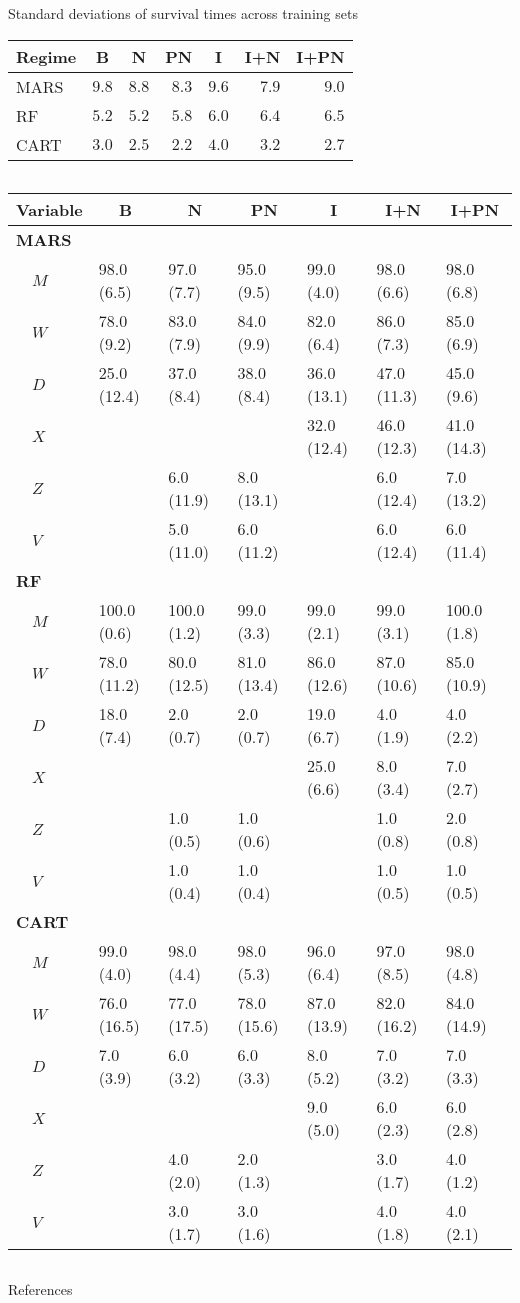 \documentclass{beamer}
\begin{document}
\begin{frame}{Standard deviations of survival times across training sets}
  \begin{table}[!htbp]
  \centering
  \begin{tabular}{lrrrrrr}
  \toprule \multicolumn{1}{c}{Regime}&\multicolumn{1}{c}{B}&\multicolumn{1}{c}{N}&\multicolumn{1}{c}{PN}&\multicolumn{1}{c}{I}&\multicolumn{1}{c}{I+N}&\multicolumn{1}{c}{I+PN}\tabularnewline
  \midrule
  MARS&$9.8$&$8.8$&$8.3$&$9.6$&$7.9$&$9.0$\tabularnewline
  RF&$5.2$&$5.2$&$5.8$&$6.0$&$6.4$&$6.5$\tabularnewline
  CART&$3.0$&$2.5$&$2.2$&$4.0$&$3.2$&$2.7$\tabularnewline
  \bottomrule
  \end{tabular}
  \end{table}
\end{frame}

\begin{frame}[c]{}
  \begin{columns}
    \column{\dimexpr\paperwidth}
\begin{table}
\scriptsize
\centering
\begin{tabular}{lllllll}
\toprule
\multicolumn{1}{l}{Variable}&\multicolumn{1}{c}{B}&\multicolumn{1}{c}{N}&\multicolumn{1}{c}{PN}&\multicolumn{1}{c}{I}&\multicolumn{1}{c}{I+N}&\multicolumn{1}{c}{I+PN}\tabularnewline
\midrule
{\bfseries MARS}&&&&&&\tabularnewline
~~$M$&98.0 (6.5)&97.0 (7.7)&95.0 (9.5)&99.0 (4.0)&98.0 (6.6)&98.0 (6.8)\tabularnewline
~~$W$&78.0 (9.2)&83.0 (7.9)&84.0 (9.9)&82.0 (6.4)&86.0 (7.3)&85.0 (6.9)\tabularnewline
~~$D$&25.0 (12.4)&37.0 (8.4)&38.0 (8.4)&36.0 (13.1)&47.0 (11.3)&45.0 (9.6)\tabularnewline
~~$X$&&&&32.0 (12.4)&46.0 (12.3)&41.0 (14.3)\tabularnewline
~~$Z$&&6.0 (11.9)&8.0 (13.1)&&6.0 (12.4)&7.0 (13.2)\tabularnewline
~~$V$&&5.0 (11.0)&6.0 (11.2)&&6.0 (12.4)&6.0 (11.4)\tabularnewline
\midrule
{\bfseries RF}&&&&&&\tabularnewline
~~$M$&100.0 (0.6)&100.0 (1.2)&99.0 (3.3)&99.0 (2.1)&99.0 (3.1)&100.0 (1.8)\tabularnewline
~~$W$&78.0 (11.2)&80.0 (12.5)&81.0 (13.4)&86.0 (12.6)&87.0 (10.6)&85.0 (10.9)\tabularnewline
~~$D$&18.0 (7.4)&2.0 (0.7)&2.0 (0.7)&19.0 (6.7)&4.0 (1.9)&4.0 (2.2)\tabularnewline
~~$X$&&&&25.0 (6.6)&8.0 (3.4)&7.0 (2.7)\tabularnewline
~~$Z$&&1.0 (0.5)&1.0 (0.6)&&1.0 (0.8)&2.0 (0.8)\tabularnewline
~~$V$&&1.0 (0.4)&1.0 (0.4)&&1.0 (0.5)&1.0 (0.5)\tabularnewline
\midrule
{\bfseries CART}&&&&&&\tabularnewline
~~$M$&99.0 (4.0)&98.0 (4.4)&98.0 (5.3)&96.0 (6.4)&97.0 (8.5)&98.0 (4.8)\tabularnewline
~~$W$&76.0 (16.5)&77.0 (17.5)&78.0 (15.6)&87.0 (13.9)&82.0 (16.2)&84.0 (14.9)\tabularnewline
~~$D$&7.0 (3.9)&6.0 (3.2)&6.0 (3.3)&8.0 (5.2)&7.0 (3.2)&7.0 (3.3)\tabularnewline
~~$X$&&&&9.0 (5.0)&6.0 (2.3)&6.0 (2.8)\tabularnewline
~~$Z$&&4.0 (2.0)&2.0 (1.3)&&3.0 (1.7)&4.0 (1.2)\tabularnewline
~~$V$&&3.0 (1.7)&3.0 (1.6)&&4.0 (1.8)&4.0 (2.1)\tabularnewline
\bottomrule
\end{tabular}
\end{table}
  \end{columns}
\end{frame}



\begin{frame}[allowframebreaks]{References}

\printbibliography[heading=none]

\end{frame}
\end{document}
